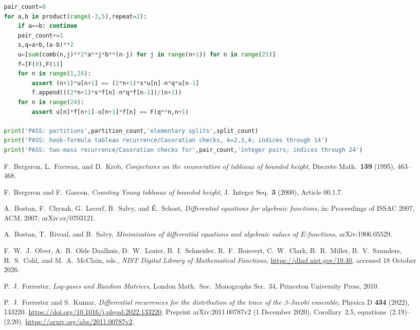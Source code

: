 \documentclass[11pt,a4paper]{article}
\theoremstyle{definition}
\theoremstyle{remark}
\numberwithin{equation}{section}
\begin{document}
\begin{lstlisting}[language=Python]
pair_count=0
for a,b in product(range(-3,5),repeat=2):
    if a==b: continue
    pair_count+=1
    s,q=a+b,(a-b)**2
    u=[sum(comb(n,j)**2*a**j*b**(n-j) for j in range(n+1)) for n in range(25)]
    f=[F(0),F(1)]
    for n in range(1,24):
        assert (n+1)*u[n+1] == (2*n+1)*s*u[n]-n*q*u[n-1]
        f.append(((2*n+1)*s*f[n]-n*q*f[n-1])/(n+1))
    for n in range(24):
        assert u[n]*f[n+1]-u[n+1]*f[n] == F(q**n,n+1)

print('PASS: partitions',partition_count,'elementary splits',split_count)
print('PASS: hook-formula tableau recurrence/Casoratian checks, k=2,3,4; indices through 14')
print('PASS: two-mass recurrence/Casoratian checks for',pair_count,'integer pairs; indices through 24')
\end{lstlisting}

\clearpage
\begin{thebibliography}{99}
F.~Bergeron, L.~Favreau, and D.~Krob,
\emph{Conjectures on the enumeration of tableaux of bounded height},
Discrete Math.\ \textbf{139} (1995), 463--468.

F.~Bergeron and F.~Gascon,
\emph{Counting Young tableaux of bounded height},
J.\ Integer Seq.\ \textbf{3} (2000), Article 00.1.7.

A.~Bostan, F.~Chyzak, G.~Lecerf, B.~Salvy, and \'E.~Schost,
\emph{Differential equations for algebraic functions},
in: Proceedings of ISSAC 2007, ACM, 2007; arXiv:cs/0703121.

A.~Bostan, T.~Rivoal, and B.~Salvy,
\emph{Minimization of differential equations and algebraic values of $E$-functions},
arXiv:1906.05529.

F.~W.~J.~Olver, A.~B.~Olde Daalhuis, D.~W.~Lozier, B.~I.~Schneider,
R.~F.~Boisvert, C.~W.~Clark, B.~R.~Miller, B.~V.~Saunders,
H.~S.~Cohl, and M.~A.~McClain, eds.,
\emph{NIST Digital Library of Mathematical Functions},
\url{https://dlmf.nist.gov/10.40}, accessed 18 October 2026.

P.~J.~Forrester,
\emph{Log-gases and Random Matrices},
London Math.\ Soc.\ Monographs Ser.~34, Princeton University Press, 2010.

P.~J.~Forrester and S.~Kumar,
\emph{Differential recurrences for the distribution of the trace of the
$\beta$-Jacobi ensemble},
Physica D \textbf{434} (2022), 133220.
\url{https://doi.org/10.1016/j.physd.2022.133220}.
Preprint arXiv:2011.00787v2 (1 December 2020), Corollary~2.5,
equations~(2.19)--(2.20).
\url{https://arxiv.org/abs/2011.00787v2}.


\end{thebibliography}
\end{document}
